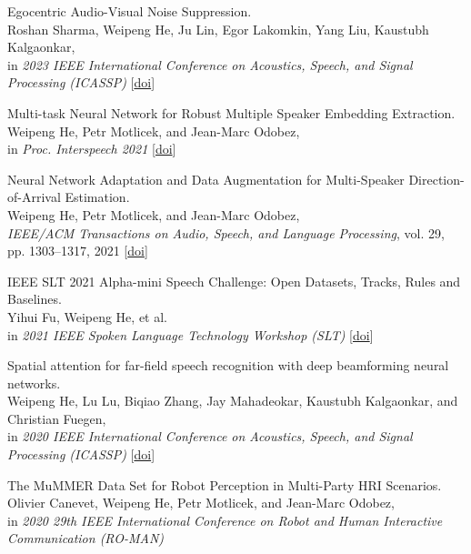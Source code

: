 \documentclass[a4paper,9pt]{extarticle} %
\begin{document}
\begin{enumerate}[label={[\arabic*]}]
  \item Egocentric Audio-Visual Noise Suppression. \\
        Roshan Sharma, Weipeng He, Ju Lin, Egor Lakomkin, Yang Liu, Kaustubh Kalgaonkar, \\
        in \textit{2023 IEEE International Conference on Acoustics, Speech, and Signal Processing (ICASSP)}
        [\href{https://doi.org/10.1109/ICASSP49357.2023.10095890}{doi}]

  \item Multi-task Neural Network for Robust Multiple Speaker Embedding Extraction. \\
        Weipeng He, Petr Motlicek, and Jean-Marc Odobez, \\
        in \textit{Proc. Interspeech 2021}
        [\href{https://doi.org/10.21437/Interspeech.2021-1769}{doi}]

  \item Neural Network Adaptation and Data Augmentation for Multi-Speaker Direction-of-Arrival Estimation. \\
        Weipeng He, Petr Motlicek, and Jean-Marc Odobez, \\
        \textit{IEEE/ACM Transactions on Audio, Speech, and Language Processing}, vol. 29, pp. 1303–1317, 2021
        [\href{https://doi.org/10.1109/TASLP.2021.3060257}{doi}]

  \item IEEE SLT 2021 Alpha-mini Speech Challenge: Open Datasets, Tracks, Rules and Baselines. \\
        Yihui Fu, Weipeng He, et al. \\
        in \textit{2021 IEEE Spoken Language Technology Workshop (SLT)}
        [\href{https://doi.org/10.1109/SLT48900.2021.9383546}{doi}]

  \item Spatial attention for far-field speech recognition with deep beamforming neural networks. \\
        Weipeng He, Lu Lu, Biqiao Zhang, Jay Mahadeokar, Kaustubh Kalgaonkar, and Christian Fuegen, \\
        in \textit{2020 IEEE International Conference on Acoustics, Speech, and Signal Processing (ICASSP)}
        [\href{https://doi.org/10.1109/ICASSP40776.2020.9053439}{doi}]

  \item The MuMMER Data Set for Robot Perception in Multi-Party HRI Scenarios. \\
        Olivier Canevet, Weipeng He, Petr Motlicek, and Jean-Marc Odobez, \\
        in \textit{2020 29th IEEE International Conference on Robot and Human Interactive Communication (RO-MAN)}


\end{enumerate}
\end{document}
